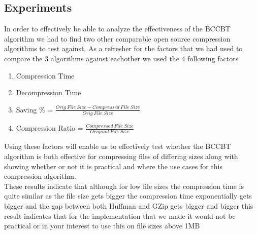 \documentclass[12pt]{IEEEtran}
\begin{document}
\subsection{Experiments}
In order to effectively be able to analyze the effectiveness of the BCCBT algorithm we had to 
find two other comparable open source compression algorithms to test against.  As a refresher for 
the factors that we had used to compare the 3 algorithms against eachother we used the 4 following
factors
\begin{enumerate}
	\item Compression Time
	\item Decompression Time
    \item Saving \% = $\frac{Orig\ File\ Size - Compressed\ File\ Size}{Orig\ File\ Size}$
    \item Compression Ratio = $\frac{Compressed\ File\ Size}{Original\ File\ Size}$
\end{enumerate}
Using these factors will enable us to effectively test whether the BCCBT algorithm is both effective 
for compressing files of differing sizes along with showing whether or not it is practical and
where the use cases for this compression algorithm.
\\
These results indicate that although for low file sizes the compression time is quite similar
as the file size gets bigger the compression time exponentially gets bigger and the gap between
both Huffman and GZip gets bigger and bigger this result indicates that for the implementation
that we made it would not be practical or in your interest to use this on file sizes above 1MB
\end{document}
